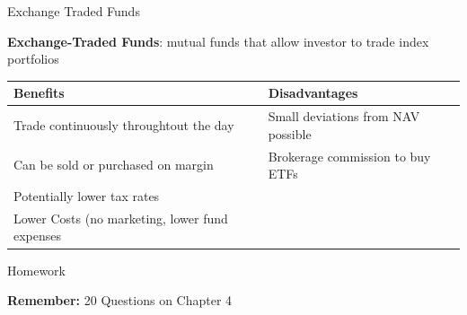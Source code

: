 \documentclass{beamer}
\begin{document}
\begin{frame}{Exchange Traded Funds}
\begin{center}
\textbf{Exchange-Traded Funds}: mutual funds that allow investor to trade index portfolios
\end{center}
\begin{tabular}{p{2in}|p{2in}}
\textbf{Benefits} & \textbf{Disadvantages} \\ \hline
Trade continuously throughtout the day & Small deviations from NAV possible \\ \hline
Can be sold or purchased on margin & Brokerage commission to buy ETFs \\ \hline
Potentially lower tax rates & \\ \hline
Lower Costs (no marketing, lower fund expenses &
\end{tabular}
\end{frame}
\begin{frame}{Homework}
\begin{center}
\textbf{Remember:} 20 Questions on Chapter 4
\end{center}
\end{frame}
\end{document}
